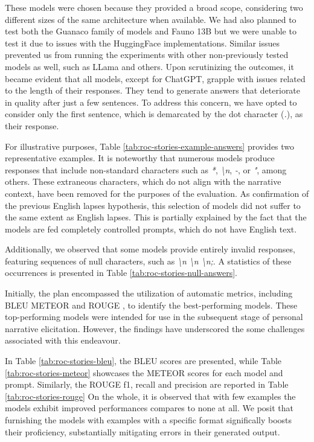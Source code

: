 These models were chosen because they provided a broad scope, considering two different sizes of the same architecture when available. We had also planned to test both the Guanaco family of models and Fauno 13B but we were unable to test it due to issues with the HuggingFace implementations. Similar issues prevented us from running the experiments with other non-previously tested models as well, such as LLama and others.
\label{cha:methodology-LLMs-selection-story-cloze-test-results}
Upon scrutinizing the outcomes, it became evident that all models, except for ChatGPT, grapple with issues related to the length of their responses. They tend to generate answers that deteriorate in quality after just a few sentences. To address this concern, we have opted to consider only the first sentence, which is demarcated by the dot character (\emph{.}), as their response.

For illustrative purposes, Table \ref{tab:roc-stories-example-answers} provides two representative examples. It is noteworthy that numerous models produce responses that include non-standard characters such as \emph{*}, \emph{\textbackslash n}, \emph{-}, or \emph{"}, among others. These extraneous characters, which do not align with the narrative context, have been removed for the purposes of the evaluation. 
As confirmation of the previous English lapses hypothesis, this selection of models did not suffer to the same extent as English lapses. This is partially explained by the fact that the models are fed completely controlled prompts, which do not have English text. 


Additionally, we observed that some models provide entirely invalid responses, featuring sequences of null characters, such as \emph{\textbackslash n \textbackslash n \textbackslash n;}. A statistics of these occurrences is presented in Table \ref{tab:roc-stories-null-answers}.

Initially, the plan encompassed the utilization of automatic metrics, including BLEU \cite{bleu} METEOR \cite{meteor} and ROUGE \cite{rouge}, to identify the best-performing models. These top-performing models were intended for use in the subsequent stage of personal narrative elicitation. However, the findings have underscored the some challenges associated with this endeavour.



In Table \ref{tab:roc-stories-bleu}, the BLEU scores are presented, while Table \ref{tab:roc-stories-meteor} showcases the METEOR scores for each model and prompt. Similarly, the ROUGE f1, recall and precision are reported in Table \ref{tab:roc-stories-rouge} On the whole, it is observed that with few examples the models exhibit improved performances compares to none at all. We posit that furnishing the models with examples with a specific format significally boosts their proficiency, substantially mitigating errors in their generated output.

